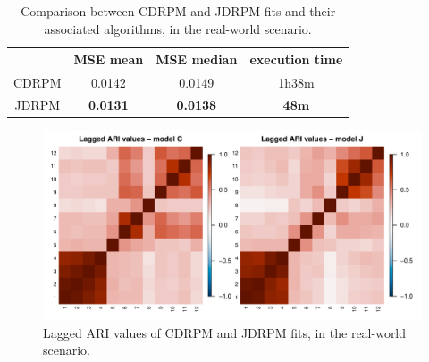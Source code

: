 \documentclass[12pt,	%
	a4paper,		%
	twoside,		%
	openright,		%
	titlepage,%
	]{book}
\theoremstyle{definition}
\begin{document}

\begin{table}[!ht]
    \caption[Comparison of CDRPM and JDRPM, real-world scenario]{Comparison between CDRPM and JDRPM fits and their associated algorithms, in the real-world scenario.}
    \centering
    \begin{tabular}{cccc}
    \toprule
              & MSE mean &  MSE median & execution time  \\
       \midrule
        CDRPM &   0.0142   & 0.0149  & 1h38m\\
        JDRPM & \textbf{0.0131}  & \textbf{0.0138}    &  \textbf{48m}\\
        \bottomrule
    \end{tabular}
    \label{tab: fits metrics space}
\end{table}


\begin{figure}[!ht]
    \centering
    \includegraphics[width=1\linewidth]{Testing/Assessing correctness/space/ari.pdf}
    \caption[Lagged ARI values of CDRPM and JDRPM, real-world scenario]{Lagged ARI values of CDRPM and JDRPM fits, in the real-world scenario.}
    \label{fig:ari space}
\end{figure}
\end{document}
